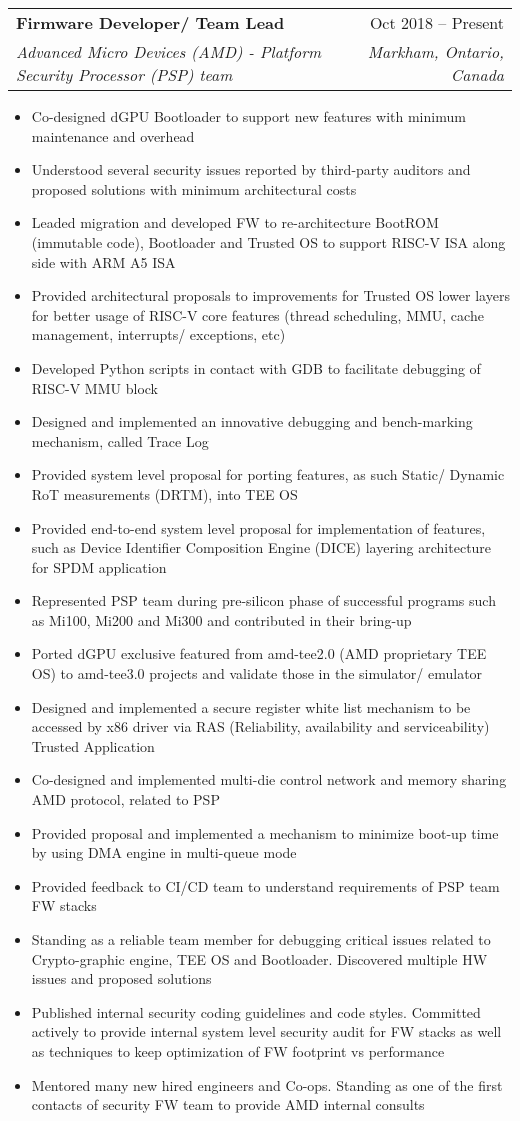 \documentclass[letterpaper,11pt]{article}
\makeatletter
\newcommand{\resumeItem}[1]{
  \item{
    {#1 \vspace{-4pt}}
  }
}
\newcommand{\resumeSubheading}[4]{
  \vspace{-2pt}\item
    \begin{tabular*}{0.97\textwidth}[t]{l@{\extracolsep{\fill}}r}
      \textbf{#1} & #2 \\
      \textit{\small #3} & \textit{\small #4} \\
    \end{tabular*}\vspace{-10pt}
}
\newcommand{\resumeItemListStart}{\begin{itemize}}
\newcommand{\resumeItemListEnd}{\end{itemize}\vspace{-2pt}}
\makeatother
\begin{document}
\resumeSubheading
        {Firmware Developer/ Team Lead}{Oct 2018 -- Present}
        {Advanced Micro Devices (AMD) - Platform Security Processor (PSP) team}{Markham, Ontario, Canada}
      \resumeItemListStart
        \small
\resumeItem{Co-designed dGPU Bootloader to support new features with minimum maintenance and overhead}
\resumeItem{Understood several security issues reported by third-party auditors and proposed solutions with minimum architectural costs}
\resumeItem{Leaded migration and developed FW to re-architecture BootROM (immutable code), Bootloader and Trusted OS to support RISC-V ISA along side with ARM A5 ISA}
\resumeItem{Provided architectural proposals to improvements for Trusted OS lower layers for better usage of RISC-V core features (thread scheduling, MMU, cache management, interrupts/ exceptions, etc)}
\resumeItem{Developed Python scripts in contact with GDB to facilitate debugging of RISC-V MMU block}
\resumeItem{Designed and implemented an innovative debugging and bench-marking mechanism, called Trace Log}
\resumeItem{Provided system level proposal for porting features, as such  Static/ Dynamic RoT measurements (DRTM), into TEE OS}
\resumeItem{Provided end-to-end system level proposal for implementation of features, such as Device Identifier Composition Engine (DICE) layering architecture for SPDM application}
\resumeItem{Represented PSP team during pre-silicon phase of successful programs such as Mi100, Mi200 and Mi300 and contributed in their bring-up}
\resumeItem{Ported dGPU exclusive featured from amd-tee2.0 (AMD proprietary TEE OS) to amd-tee3.0 projects and validate those in the simulator/ emulator}
\resumeItem{Designed and implemented a secure register white list mechanism to be accessed by x86 driver via RAS (Reliability, availability and serviceability) Trusted Application}
\resumeItem{Co-designed and implemented multi-die control network and memory sharing AMD protocol, related to PSP} 
\resumeItem{Provided proposal and implemented a mechanism to minimize boot-up time by using DMA engine in multi-queue mode}
\resumeItem{Provided feedback to CI/CD team to understand requirements of PSP team FW stacks}
\resumeItem{Standing as a reliable team member for debugging critical issues related to Crypto-graphic engine, TEE OS and Bootloader. Discovered multiple HW issues and proposed solutions}
\resumeItem{Published internal security coding guidelines and code styles. Committed actively to provide internal system level security audit for FW stacks as well as techniques to keep optimization of FW footprint vs performance}
\resumeItem{Mentored many new hired engineers and Co-ops. Standing as one of the first contacts of security FW team to provide AMD internal consults}
    \resumeItemListEnd
\end{document}
